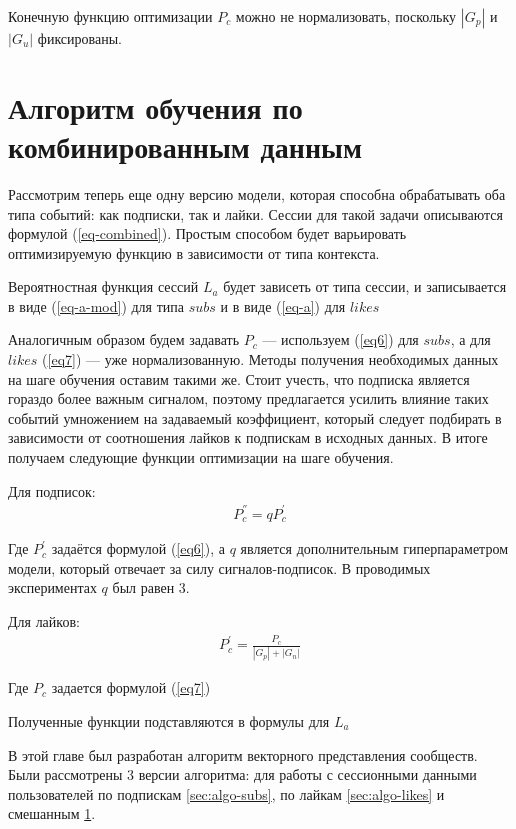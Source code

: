 \documentclass[times,specification,annotation]{itmo-student-thesis}
\begin{document}
Конечную функцию оптимизации  $P_c$ можно не нормализовать, поскольку $|G_p|$ и $|G_u|$ фиксированы.

\section{Алгоритм обучения по комбинированным данным}\label{sec:algo-combined}

Рассмотрим теперь еще одну версию модели, которая способна обрабатывать оба типа событий: как подписки, так и лайки. Сессии для такой задачи описываются формулой (\ref{eq-combined}). Простым способом будет варьировать оптимизируемую функцию в зависимости от типа контекста. 

Вероятностная функция сессий $L_a$ будет зависеть от типа сессии, и записывается в виде (\ref{eq-a-mod}) для типа $subs$ и в виде (\ref{eq-a}) для $likes$

Аналогичным образом будем задавать $P_c$ --- используем (\ref{eq6}) для $subs$, а для $likes$ (\ref{eq7}) --- уже нормализованную. Методы получения необходимых данных на шаге обучения оставим такими же. Стоит учесть, что подписка является гораздо более важным сигналом, поэтому предлагается усилить влияние таких событий умножением на задаваемый коэффициент, который следует подбирать в зависимости от соотношения лайков к подпискам в исходных данных. В итоге получаем следующие функции оптимизации на шаге обучения.

Для подписок:
\begin{align*}
P^{''}_c = qP^{'}_c
\end{align*}

Где $P^{'}_c$ задаётся формулой  (\ref{eq6}), а $q$ является дополнительным гиперпараметром модели, который отвечает за силу сигналов-подписок. В проводимых экспериментах $q$ был равен 3.

Для лайков:
\begin{align*}
P^{'}_c = \frac{P_c}{|G_p| +|G_n|} 
\end{align*}

Где $P_c$ задается формулой  (\ref{eq7})

Полученные функции подставляются в формулы для $L_a$

\chapterconclusion

В этой главе был разработан алгоритм векторного представления сообществ. Были рассмотрены 3 версии алгоритма: для работы с сессионными данными пользователей по подпискам \ref{sec:algo-subs}, по лайкам \ref{sec:algo-likes} и смешанным \ref{sec:algo-combined}.
\end{document}
